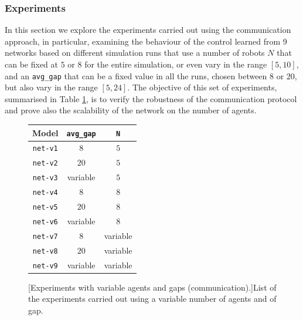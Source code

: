 \subsubsection{Experiments}
\label{subsubsec:expcomm2}

In this section we explore the experiments carried out using the communication 
approach, in particular, examining the behaviour of the control learned from 9 
networks based on different simulation runs that use a number of robots $N$ that 
can be fixed at $5$ or $8$ for the entire simulation, or even vary in the range $[5, 
10]$, and an \texttt{avg\_gap} that can be a fixed value in all the runs, chosen 
between $8$ or $20$, but also vary in the range $[5, 24]$. 
The objective of this set of experiments, summarised in Table 
\ref{tab:modelcommt2}, is to verify the robustness of the communication 
protocol and prove also the scalability of the network on the number of agents.
\begin{figure}[!htb]
	\centering
	\begin{tabular}{ccc}
		\toprule
		\textbf{Model} \quad & \textbf{\texttt{avg\_gap}} & \textbf{\texttt{N}}\\
		\midrule
		\texttt{net-v1}   &  $8$		 &	 $5$ \\
		\texttt{net-v2}   &  $20$		&	$5$ \\
		\texttt{net-v3}   &  variable   &    $5$\\
		\texttt{net-v4}   &  $8$		 &	  $8$ \\
		\texttt{net-v5}   & $20$   		&	 $8$ \\
		\texttt{net-v6}   &  variable	&	 $8$ \\
		\texttt{net-v7}   &  $ 8$		  &	 variable\\
		\texttt{net-v8}   &  $20$		 &	variable\\
		\texttt{net-v9}   &  variable	 &	variable\\
		\bottomrule
	\end{tabular}
	[Experiments with variable agents and gaps 
	(communication).]{List of the experiments carried out using a variable number 
	of agents and of gap.}
	\label{tab:modelcommt2}
\end{figure}

